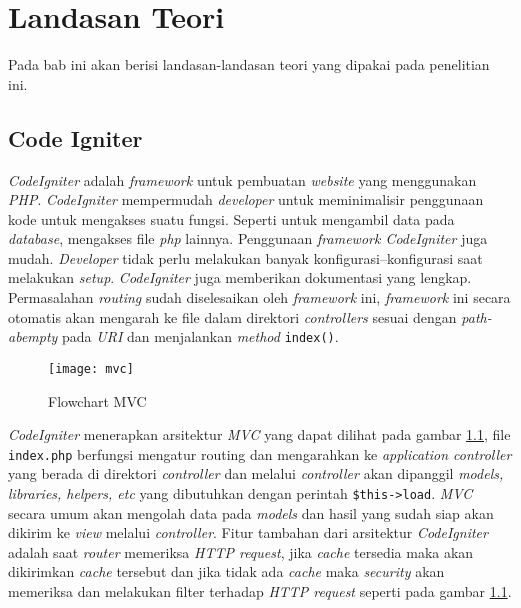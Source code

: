 \chapter{Landasan Teori}
\label{chap:teori}


Pada bab ini akan berisi landasan-landasan teori yang dipakai pada penelitian ini.

\section{Code Igniter}
\label{sec:codeigniter}


\textit{CodeIgniter}\cite{codeigniter3} adalah \textit{framework} untuk pembuatan \textit{website} yang menggunakan \textit{PHP}. \textit{CodeIgniter} mempermudah \textit{developer} untuk meminimalisir penggunaan kode untuk mengakses suatu fungsi. Seperti untuk mengambil data pada \textit{database}, mengakses file \textit{php} lainnya. Penggunaan \textit{framework CodeIgniter} juga mudah.\textit{ Developer} tidak perlu melakukan banyak konfigurasi--konfigurasi saat melakukan \textit{setup}. \textit{CodeIgniter} juga memberikan dokumentasi yang lengkap. Permasalahan \textit{routing}  sudah diselesaikan oleh \textit{framework} ini, \textit{framework} ini secara otomatis akan mengarah ke file dalam direktori \textit{controllers} sesuai dengan \textit{path-abempty} pada \textit{URI}  dan menjalankan \textit{method} \texttt{index()}.


\begin{figure}[H]
	\centering
	\texttt{[image: mvc]} 
	\caption{Flowchart MVC}
	\label{fig:appflowchart} 
\end{figure}


\textit{CodeIgniter} menerapkan arsitektur \textit{MVC} yang dapat dilihat pada gambar \ref{fig:appflowchart}, file \texttt{index.php} berfungsi mengatur routing dan mengarahkan ke \textit{application controller} yang berada di direktori \textit{controller} dan melalui \textit{controller} akan dipanggil \textit{models, libraries, helpers, etc} yang dibutuhkan dengan perintah \texttt{\$this->load}. \textit{MVC} secara umum akan mengolah data pada \textit{models} dan hasil yang sudah siap akan dikirim ke \textit{view} melalui \textit{controller}. Fitur tambahan dari arsitektur \textit{CodeIgniter} adalah saat \textit{router} memeriksa \textit{HTTP request}, jika \textit{cache} tersedia maka akan dikirimkan \textit{cache} tersebut dan jika tidak ada \textit{cache} maka \textit{security} akan memeriksa dan melakukan filter terhadap \textit{HTTP request} seperti pada gambar \ref{fig:appflowchart}. 

